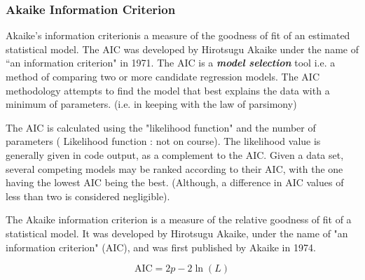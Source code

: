 \begin{frame}
\frametitle{Akaike Information Criterion}


Akaike's information criterionis a measure of the goodness of fit of
an estimated statistical model. The AIC was developed by Hirotsugu Akaike under the name of ``an information criterion" in 1971. The AIC is a \textbf{\textit{model selection}} tool i.e. a method of comparing two
or more candidate regression models. The AIC methodology attempts to find the model that best explains the data with a minimum of parameters. (i.e. in keeping with the law of parsimony)
\end{frame}
\begin{frame}
The AIC is calculated using the "likelihood function" and the number of parameters ( Likelihood function : not on course). The likelihood value is generally given in code output, as a complement to the AIC.
Given a data set, several competing models may be ranked according to their AIC, with the one having the lowest AIC being the best. (Although, a difference in AIC values of less than two is considered negligible).
\end{frame}
\begin{frame}
The Akaike information criterion is a measure of the relative goodness of fit of a statistical model. It was developed by Hirotsugu Akaike, under the name of "an information criterion" (AIC), and was first published by Akaike in 1974.
\bigskip

\[\mbox{AIC} = 2p - 2\ln(L)\]
\end{frame}
